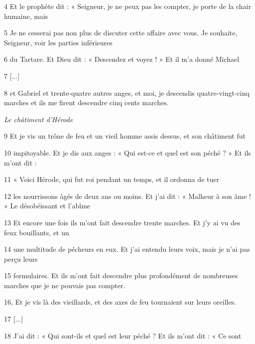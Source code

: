 \par 4 Et le prophète dit : « Seigneur, je ne peux pas les compter, je porte de la chair humaine, mais

\par 5 Je ne cesserai pas non plus de discuter cette affaire avec vous. Je souhaite, Seigneur, voir les parties inférieures

\par 6 du Tartare. Et Dieu dit : « Descendez et voyez ! » Et il m'a donné Michael

\par 7 [...]

\par 8 et Gabriel et trente-quatre autres anges, et moi, je descendis quatre-vingt-cinq marches et ils me firent descendre cinq cents marches.

\par \textit{Le châtiment d'Hérode}

\par 9 Et je vis un trône de feu et un vieil homme assis dessus, et son châtiment fut

\par 10 impitoyable. Et je dis aux anges : « Qui est-ce et quel est son péché ? » Et ils m'ont dit :

\par 11 « Voici Hérode, qui fut roi pendant un temps, et il ordonna de tuer

\par 12 les nourrissons âgés de deux ans ou moins. Et j’ai dit : « Malheur à son âme ! » Le désobéissant et l'abîme

\par 13 Et encore une fois ils m'ont fait descendre trente marches. Et j'y ai vu des feux bouillants, et un

\par 14 une multitude de pécheurs en eux. Et j'ai entendu leurs voix, mais je n'ai pas perçu leurs

\par 15 formulaires. Et ils m'ont fait descendre plus profondément de nombreuses marches que je ne pouvais pas compter.

\par 16, Et je vis là des vieillards, et des axes de feu tournaient sur leurs oreilles.

\par 17 [...]

\par 18 J'ai dit : « Qui sont-ils et quel est leur péché ? Et ils m'ont dit : « Ce sont

